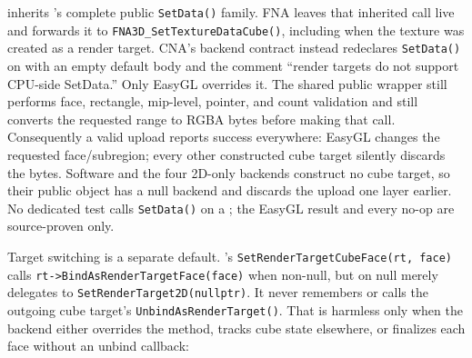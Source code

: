  inherits 's complete public
\texttt{SetData()} family. FNA leaves that inherited call live and forwards it to
\texttt{FNA3D\_SetTextureDataCube()}, including when the texture was created as a render
target. CNA's backend contract instead redeclares \texttt{SetData()} on
 with an empty default body and the comment ``render targets
do not support CPU-side SetData.'' Only EasyGL overrides it. The shared public wrapper still
performs face, rectangle, mip-level, pointer, and count validation and still converts the
requested  range to RGBA bytes before making that call. Consequently a valid
upload reports success everywhere: EasyGL changes the requested face/subregion; every other
constructed cube target silently discards the bytes. Software and the four 2D-only backends
construct no cube target, so their public object has a null backend and discards the upload
one layer earlier. No dedicated test calls \texttt{SetData()} on a
; the EasyGL result and every no-op are source-proven only.

Target switching is a separate default. 's
\texttt{SetRenderTargetCubeFace(rt, face)} calls
\texttt{rt->BindAsRenderTargetFace(face)} when non-null, but on null merely delegates to
\texttt{SetRenderTarget2D(nullptr)}. It never remembers or calls the outgoing cube target's
\texttt{UnbindAsRenderTarget()}. That is harmless only when the backend either overrides the
method, tracks cube state elsewhere, or finalizes each face without an unbind callback:

